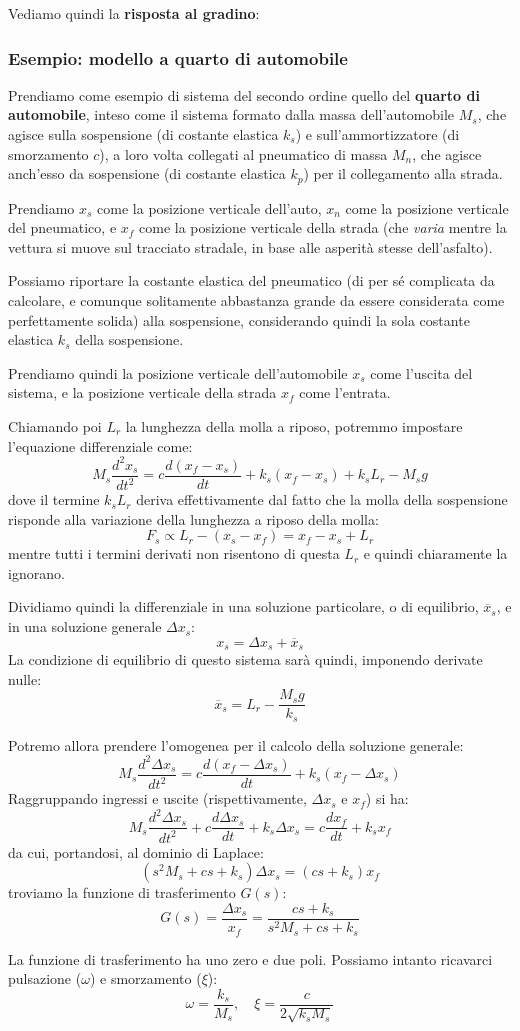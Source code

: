 \documentclass[a4paper,11pt]{article}
\begin{document}
Vediamo quindi la \textbf{risposta al gradino}:


\subsubsection{Esempio: modello a quarto di automobile}
Prendiamo come esempio di sistema del secondo ordine quello del \textbf{quarto di automobile}, inteso come il sistema formato dalla massa dell'automobile $M_s$, che agisce sulla sospensione (di costante elastica $k_s$) e sull'ammortizzatore (di smorzamento $c$), a loro volta collegati al pneumatico di massa $M_n$, che agisce anch'esso da sospensione (di costante elastica $k_p$) per il collegamento alla strada.

Prendiamo $x_s$ come la posizione verticale dell'auto, $x_n$ come la posizione verticale del pneumatico, e $x_f$ come la posizione verticale della strada (che \textit{varia} mentre la vettura si muove sul tracciato stradale, in base alle asperità stesse dell'asfalto).

Possiamo riportare la costante elastica del pneumatico (di per sé complicata da calcolare, e comunque solitamente abbastanza grande da essere considerata come perfettamente solida) alla sospensione, considerando quindi la sola costante elastica $k_s$ della sospensione.

Prendiamo quindi la posizione verticale dell'automobile $x_s$ come l'uscita del sistema, e la posizione verticale della strada $x_f$ come l'entrata.

Chiamando poi $L_r$ la lunghezza della molla a riposo, potremmo impostare l'equazione differenziale come:
$$
M_s \frac{d^2 x_s}{dt^2} = c \frac{d ( x_f - x_s )}{dt} + k_s (x_f - x_s) + k_s L_r - M_s g
$$
dove il termine $k_s L_r$ deriva effettivamente dal fatto che la molla della sospensione risponde alla variazione della lunghezza a riposo della molla:
$$
F_s \propto  L_r - (x_s - x_f) = x_f - x_s + L_r
$$
mentre tutti i termini derivati non risentono di questa $L_r$ e quindi chiaramente la ignorano.

Dividiamo quindi la differenziale in una soluzione particolare, o di equilibrio, $\overline{x}_s$, e in una soluzione generale $\Delta x_s$:
$$
x_s = \Delta x_s + \overline{x}_s
$$
La condizione di equilibrio di questo sistema sarà quindi, imponendo derivate nulle:
$$
\overline{x}_s = L_r - \frac{M_s g}{k_s}
$$

Potremo allora prendere l'omogenea per il calcolo della soluzione generale:
$$
M_s \frac{d^2 \Delta x_s}{dt^2} = c \frac{d ( x_f - \Delta x_s )}{dt} + k_s (x_f - \Delta x_s)
$$
Raggruppando ingressi e uscite (rispettivamente, $\Delta x_s$ e $x_f$) si ha:
$$
M_s \frac{d^2 \Delta x_s}{dt^2} + c \frac{d \Delta x_s}{dt} + k_s \Delta x_s = c \frac{dx_f}{dt} + k_s x_f
$$
da cui, portandosi, al dominio di Laplace:
$$
\left( s^2 M_s + cs + k_s \right) \Delta x_s = ( cs + k_s ) x_f
$$
troviamo la funzione di trasferimento $G(s)$:
$$
G(s) = \frac{\Delta x_s}{x_f} = \frac{c s + k_s}{s^2 M_s + c s + k_s}
$$

La funzione di trasferimento ha uno zero e due poli.
Possiamo intanto ricavarci pulsazione ($\omega$) e smorzamento ($\xi$):
$$
\omega = \frac{k_s}{M_s}, \quad \xi = \frac{c}{2 \sqrt{k_s M_s}}
$$
\end{document}
